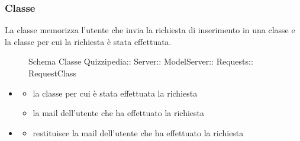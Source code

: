 \subsubsection{Classe }
La classe memorizza l'utente che invia la richiesta di inserimento in una classe e la classe per cui la richiesta è stata effettuata.
\begin{figure}[H]
\centering
\noindent{}
\caption[Schema Classe RequestClass]{Schema Classe Quizzipedia:: Server:: ModelServer:: Requests:: RequestClass}
\end{figure}
\begin{itemize}
\item {}
\begin{itemize}
\item {}
\newline
la classe per cui è stata effettuata la richiesta
\item {}
\newline
la mail dell'utente che ha effettuato la richiesta
\end{itemize}
\item {}
\begin{itemize}
\item {}
\newline
restituisce la mail dell'utente che ha effettuato la richiesta
\newline
\end{itemize}
\end{itemize}
